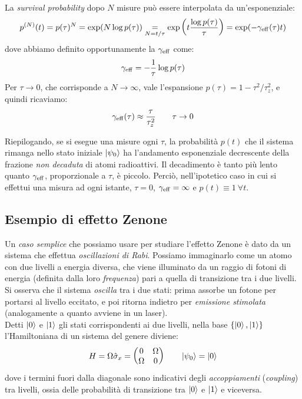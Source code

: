 \documentclass[../../InformazioneQuantistica.tex]{subfiles}
\begin{document}
La \textit{survival probability} dopo $N$ misure può essere interpolata da un'esponenziale:
\begin{align}
p^{(N)}(t) = p(\tau)^N = \exp(N\log p(\tau)) \underset{N=t/\tau}{=} \exp\left(t \frac{\log p(\tau)}{\tau}\right) = \exp(-\gamma_{\operatorname{eff}}(\tau)t)
\label{eqn:Zeno-exp}
\end{align}
dove abbiamo definito opportunamente la  $\gamma_{\operatorname{eff}}$ come:
\begin{align*}
\gamma_{\operatorname{eff}} = -\frac{1}{\tau}\log p(\tau)
\end{align*}
Per $\tau \to 0$, che corrisponde a $N\to \infty$, vale l'espansione $p(\tau)=1-\tau^2/\tau_z^2$, e quindi ricaviamo:
\begin{align}
\gamma_{\operatorname{eff}}(\tau) \approx \frac{\tau}{\tau_z^2}\qquad \tau \to 0
\label{eqn:gamma-eff}
\end{align}

Riepilogando, se si esegue una misure ogni $\tau$, la probabilità $p(t)$ che il sistema rimanga nello stato iniziale $\Ket{\psi_0}$ ha l'andamento esponenziale decrescente della frazione \textit{non decaduta} di atomi radioattivi. Il decadimento è tanto più lento quanto $\gamma_{\operatorname{eff}}$, proporzionale a $\tau$, è piccolo. Perciò, nell'ipotetico caso in cui si effettui una misura ad ogni istante, $\tau=0$, $\gamma_{\operatorname{eff}}=\infty$ e $p(t)\equiv 1 \> \forall t$.

\subsection{Esempio di effetto Zenone}
Un \textit{caso semplice} che possiamo usare per studiare l'effetto Zenone è dato da un sistema che effettua \textit{oscillazioni di Rabi}. Possiamo immaginarlo come un atomo con due livelli a energia diversa, che viene illuminato da un raggio di fotoni di energia (definita dalla loro \textit{frequenza}) pari a quella di transizione tra i due livelli. Si osserva che il sistema \textit{oscilla} tra i due stati: prima assorbe un fotone per portarsi al livello eccitato, e poi ritorna indietro per \textit{emissione stimolata} (analogamente a quanto avviene in un laser).\\

Detti $\Ket{0}$ e $\Ket{1}$ gli stati corrispondenti ai due livelli, nella base $\{\Ket{0},\Ket{1}\}$ l'Hamiltoniana di un sistema del genere diviene:
\begin{align}
H = \Omega \hat{\sigma}_x = \begin{pmatrix}0 & \Omega\\\Omega & 0\end{pmatrix} \qquad \Ket{\psi_0}=\Ket{0}
\label{eqn:rabi-oscillation-H}
\end{align}
dove i termini fuori dalla diagonale sono indicativi degli \textit{accoppiamenti} (\textit{coupling}) tra livelli, ossia delle probabilità di transizione tra $\Ket{0}$ e $\Ket{1}$ e viceversa.\\
\end{document}
